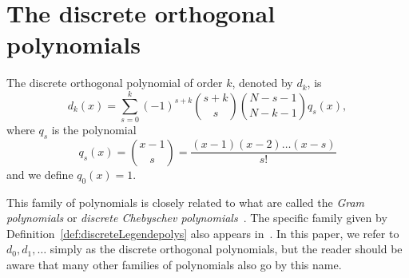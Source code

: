 \documentclass[review]{elsarticle}
\begin{document}

\section{The discrete orthogonal polynomials}\label{sec:discr-orth-polyn}

\begin{definition}  \label{def:discreteLegendepolys}
The discrete orthogonal polynomial of order $k$, denoted by $d_k$, is
\[
d_k(x) = \sum_{s=0}^k{(-1)^{s+k}\binom{s+k}{s}\binom{N-s-1}{N-k-1}q_s(x)},
\]
where $q_s$ is the polynomial
\[
q_s(x) = \binom{x-1}{s} = \frac{(x-1)(x-2)\dots(x-s)}{s!}
\]
and we define $q_0(x) = 1$.
\end{definition}
This family of polynomials is closely related to what are called the \emph{Gram polynomials} or \emph{discrete Chebyschev polynomials}~\cite[p. 323]{Bjork_num_methods_least_square_1996}\cite{Chebyshev_discrete_polys1864,Gram_discrete_polys1883}.  The specific family given by Definition~\ref{def:discreteLegendepolys} also appears in~\cite{Eisinberg2007_discerete_otho_poly_equidist}.  In this paper, we refer to $d_0,d_1,\dots$ simply as the discrete orthogonal polynomials, but the reader should be aware that many other families of polynomials also go by this name.  
\end{document}
